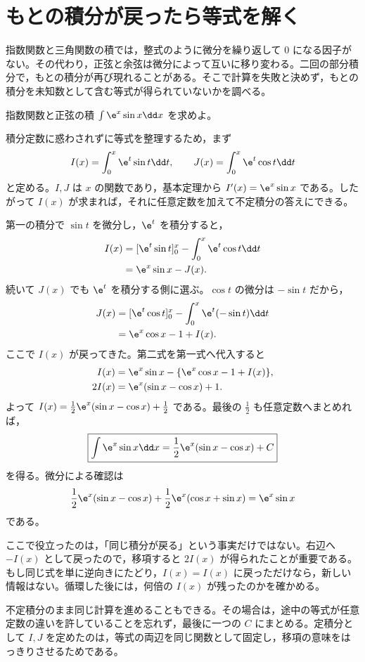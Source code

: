 \section{もとの積分が戻ったら等式を解く}\label{節:部分積分の循環}

指数関数と三角関数の積では，整式のように微分を繰り返して $0$ になる因子がない。その代わり，正弦と余弦は微分によって互いに移り変わる。二回の部分積分で，もとの積分が再び現れることがある。そこで計算を失敗と決めず，もとの積分を未知数として含む等式が得られていないかを調べる。

\begin{example}{指数関数と正弦の積}
$\int\e^x\sin x\dd x$ を求めよ。
\end{example}

積分定数に惑わされずに等式を整理するため，まず
\[
 I(x)=\int_0^x\e^t\sin t\dd t,\qquad
 J(x)=\int_0^x\e^t\cos t\dd t
\]
と定める。$I,J$ は $x$ の関数であり，基本定理から $I'(x)=\e^x\sin x$ である。したがって $I(x)$ が求まれば，それに任意定数を加えて不定積分の答えにできる。

第一の積分で $\sin t$ を微分し，$\e^t$ を積分すると，
\[
\begin{aligned}
 I(x)
 &=[\e^t\sin t]_0^x-\int_0^x\e^t\cos t\dd t\\
 &=\e^x\sin x-J(x).
\end{aligned}
\]
続いて $J(x)$ でも $\e^t$ を積分する側に選ぶ。$\cos t$ の微分は $-\sin t$ だから，
\[
\begin{aligned}
 J(x)
 &=[\e^t\cos t]_0^x-\int_0^x\e^t(-\sin t)\dd t\\
 &=\e^x\cos x-1+I(x).
\end{aligned}
\]
ここで $I(x)$ が戻ってきた。第二式を第一式へ代入すると
\[
\begin{aligned}
 I(x)
 &=\e^x\sin x-\{\e^x\cos x-1+I(x)\},\\
 2I(x)&=\e^x(\sin x-\cos x)+1.
\end{aligned}
\]
よって $I(x)=\frac12\e^x(\sin x-\cos x)+\frac12$ である。最後の $\frac12$ も任意定数へまとめれば，
\[
 \boxed{\int\e^x\sin x\dd x
 =\frac12\e^x(\sin x-\cos x)+C}
\]
を得る。微分による確認は
\[
 \frac12\e^x(\sin x-\cos x)
 +\frac12\e^x(\cos x+\sin x)
 =\e^x\sin x
\]
である。

ここで役立ったのは，「同じ積分が戻る」という事実だけではない。右辺へ $-I(x)$ として戻ったので，移項すると $2I(x)$ が得られたことが重要である。もし同じ式を単に逆向きにたどり，$I(x)=I(x)$ に戻っただけなら，新しい情報はない。循環した後には，何倍の $I(x)$ が残ったのかを確かめる。

不定積分のまま同じ計算を進めることもできる。その場合は，途中の等式が任意定数の違いを許していることを忘れず，最後に一つの $C$ にまとめる。定積分として $I,J$ を定めたのは，等式の両辺を同じ関数として固定し，移項の意味をはっきりさせるためである。

